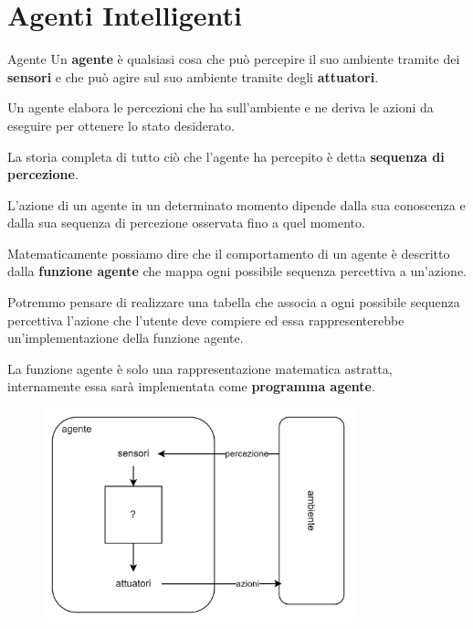 \chapter{Agenti Intelligenti}

\begin{definition-box}{Agente}
Un \textbf{agente} è qualsiasi cosa che può percepire il suo ambiente
tramite dei \textbf{sensori} e che può agire sul suo ambiente
tramite degli \textbf{attuatori}.
\end{definition-box}

Un agente elabora le percezioni che ha sull'ambiente e ne deriva le azioni da
eseguire per ottenere lo stato desiderato.

La storia completa di tutto ciò che l'agente ha percepito è detta
\textbf{sequenza di percezione}.

L'azione di un agente in un determinato momento dipende dalla sua conoscenza e
dalla sua sequenza di percezione osservata fino a quel momento.

Matematicamente possiamo dire che il comportamento di un agente è descritto
dalla \textbf{funzione agente} che mappa ogni possibile sequenza percettiva a
un'azione.

Potremmo pensare di realizzare una tabella che associa a ogni possibile
sequenza percettiva l'azione che l'utente deve compiere ed essa rappresenterebbe
un'implementazione della funzione agente.

La funzione agente è solo una rappresentazione matematica astratta,
internamente essa sarà implementata come \textbf{programma agente}.

\begin{figure}[H]
	\centering
	\includegraphics[width=0.8\textwidth]{capitoli/agenti-intelligenti/imgs/agente.png}
\end{figure}

